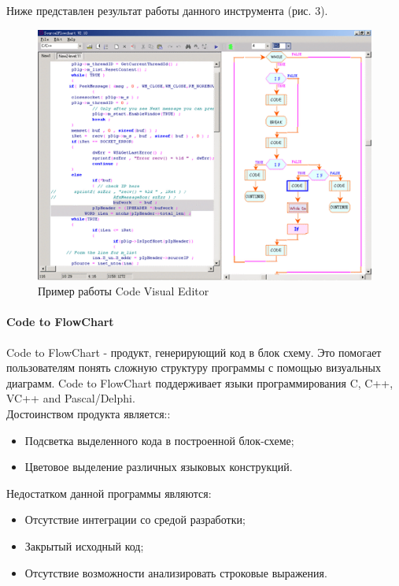 \documentclass{matmex-diploma}
\begin{document}
Ниже представлен результат работы данного инструмента (рис. 3).
\begin{figure}[h]
\label{CodeVisual}
\centering
\includegraphics{CodeVisualEditor.png}
\caption{Пример работы Code Visual Editor}
\end{figure}


\paragraph {Code to FlowChart}
Code to FlowChart - продукт, генерирующий код в блок схему. Это помогает пользователям понять сложную структуру программы с помощью визуальных диаграмм. Code to FlowChart поддерживает языки программирования C, C++, VC++ and Pascal/Delphi.   \\
Достоинством продукта является::

\begin{itemize}

        \item { Подсветка выделенного кода в построенной блок-схеме; }
        \item { Цветовое выделение различных языковых конструкций. }
        
 \end{itemize}
Недостатком данной программы являются:
\newpage{}
\begin{itemize}

        \item { Отсутствие интеграции со средой разработки; }
        \item { Закрытый исходный код; }
        \item { Отсутствие возможности анализировать строковые выражения. }
        
 \end{itemize}
\end{document}
